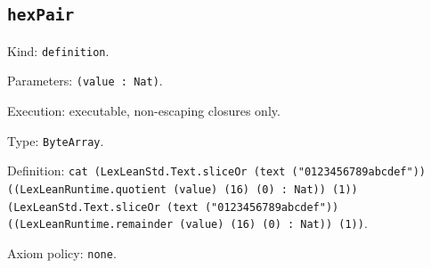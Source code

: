 \documentclass[11pt]{article}
\begin{document}
\subsection*{\texttt{hexPair}}
\noindent Kind: \texttt{definition}.\par
\noindent Parameters: \texttt{(value : Nat)}.\par
\noindent Execution: executable, non-escaping closures only.\par
\noindent Type: \texttt{ByteArray}.\par
\noindent Definition: \texttt{cat (LexLeanStd.Text.sliceOr (text ("0123456789abcdef")) ((LexLeanRuntime.quotient (value) (16) (0) : Nat)) (1)) (LexLeanStd.Text.sliceOr (text ("0123456789abcdef")) ((LexLeanRuntime.remainder (value) (16) (0) : Nat)) (1))}.\par
\noindent Axiom policy: \texttt{none}.\par
\end{document}

